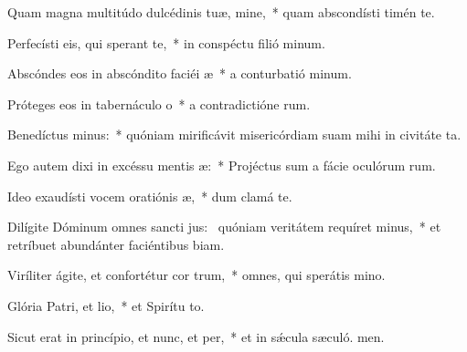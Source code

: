 \item Quam magna multitúdo dulcédinis tuæ, mine,~* quam abscondísti timén te.
\item Perfecísti eis, qui sperant  te,~* in conspéctu filió minum.
\item Abscóndes eos in abscóndito faciéi æ~* a conturbatió minum.
\item Próteges eos in tabernáculo o~* a contradictióne rum.
\item Benedíctus minus:~* quóniam mirificávit misericórdiam suam mihi in civitáte ta.
\item Ego autem dixi in excéssu mentis æ:~* Projéctus sum a fácie oculórum rum.
\item Ideo exaudísti vocem oratiónis æ,~* dum clamá  te.
\item Dilígite Dóminum omnes sancti jus:~\pscross{} quóniam veritátem requíret minus,~* et retríbuet abundánter faciéntibus biam.
\item Viríliter ágite, et confortétur cor trum,~* omnes, qui sperátis  mino.
\item Glória Patri, et lio,~* et Spirítu to.
\item Sicut erat in princípio, et nunc, et per,~* et in sǽcula sæculó. men.
